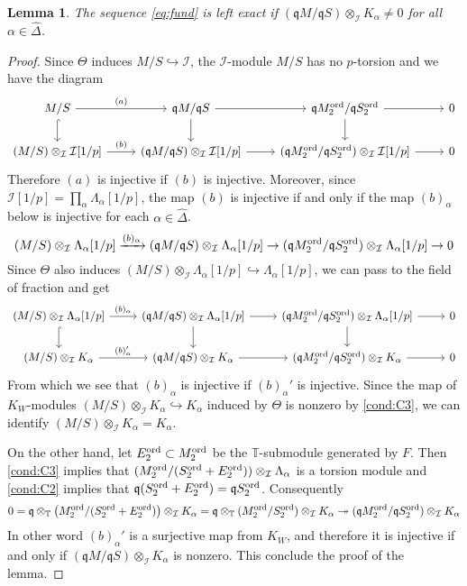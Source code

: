 \documentclass[leqno]{amsart}
\newtheorem{lem}[thm]{Lemma}
\theoremstyle{definition}
\theoremstyle{remark}
\newcommand{\fq}{\mathfrak{q}}
\newcommand{\TT}{\mathbb{T}} %
\newcommand{\I}{\mathcal{I}} %
\newcommand{\ord}{\textnormal{ord}} %
\begin{document}
\begin{lem}\label{lem:inj_crit}
The sequence \eqref{eq:fund}
is left exact if 
$(\fq M/\fq S)\otimes_{\I}K_\alpha\neq 0$
for all $\alpha\in\hat{\Delta}$.
\end{lem}
\begin{proof}
Since $\Theta$ induces $M/S\hookrightarrow\I$,
the $\I$-module $M/S$ has no $p$-torsion and we have the diagram
\[
\begin{tikzcd}
M/S
\arrow[r,"(a)"]\arrow[d,hookrightarrow] &
\fq M/\fq S
\arrow[r]\arrow[d] &
\fq M_2^{\ord}/\fq S_2^{\ord}
\arrow[r]\arrow[d] & 0\\
(M/S)\otimes_{\I}\I[1/p]
\arrow[r,"(b)"] &
(\fq M/\fq S)\otimes_{\I}\I[1/p]
\arrow[r] &
(\fq M_2^{\ord}/\fq S_2^{\ord})\otimes_{\I}\I[1/p]
\arrow[r] & 0
\end{tikzcd}
\]
Therefore $(a)$ is injective if
$(b)$ is injective.
Moreover, since $\I[1/p]=\prod_\alpha \Lambda_\alpha[1/p]$,
the map $(b)$ is injective if and only if the map $(b)_\alpha$ below
is injective for each $\alpha\in\hat{\Delta}$.
\[
(M/S)\otimes_{\I}\Lambda_\alpha[1/p]
\xrightarrow{(b)_\alpha}
(\fq M/\fq S)\otimes_{\I}\Lambda_\alpha[1/p] \to
(\fq M_2^{\ord}/\fq S_2^{\ord})\otimes_{\I}\Lambda_\alpha[1/p]\to 0
\]
Since $\Theta$ also induces
$(M/S)\otimes_{\I}\Lambda_\alpha[1/p]
\hookrightarrow\Lambda_\alpha[1/p]$,
we can pass to the field of fraction and get
\[
\begin{tikzcd}
(M/S)\otimes_{\I}\Lambda_\alpha[1/p]
\arrow[r,"(b)_\alpha"]\arrow[d,hookrightarrow] &
(\fq M/\fq S)\otimes_{\I}\Lambda_\alpha[1/p]
\arrow[r]\arrow[d] &
(\fq M_2^{\ord}/\fq S_2^{\ord})\otimes_{\I}\Lambda_\alpha[1/p]
\arrow[r]\arrow[d] & 0\\
(M/S)\otimes_{\I}K_\alpha
\arrow[r,"(b)_\alpha'"] &
(\fq M/\fq S)\otimes_{\I}K_\alpha
\arrow[r] &
(\fq M_2^{\ord}/\fq S_2^{\ord})\otimes_{\I}K_\alpha
\arrow[r] & 0
\end{tikzcd}
\]
From which we see that $(b)_\alpha$ 
is injective if $(b)_\alpha'$ is injective.
Since the map of $K_W$-modules
$(M/S)\otimes_{\I}K_\alpha\hookrightarrow K_\alpha$
induced by $\Theta$ is nonzero by \ref{cond:C3},
we can identify
$(M/S)\otimes_{\I}K_\alpha=K_\alpha$.

On the other hand,
let $E_2^{\ord}\subset M_2^{\ord}$
be the $\TT$-submodule generated by $F$.
Then \ref{cond:C3} implies that
$(M_2^{\ord}/(S_2^{\ord}+E_2^{\ord}))\otimes_{\I}\Lambda_\alpha$
is a torsion module and \ref{cond:C2} implies that
$\fq(S_2^{\ord}+E_2^{\ord})=\fq S_2^{\ord}$.
Consequently
\[
    0=\fq\otimes_{\TT}\left(M_2^{\ord}/(S_2^{\ord}+E_2^{\ord})\right)
    \otimes_{\I}K_\alpha
    =\fq\otimes_{\TT}(M_2^{\ord}/S_2^{\ord})
    \otimes_{\I}K_\alpha
    \twoheadrightarrow
    (\fq M_2^{\ord}/\fq S_2^{\ord})\otimes_{\I}K_\alpha
\]
In other word $(b)_\alpha'$ is a surjective map from $K_W$,
and therefore it is injective if and only if
$(\fq M/\fq S)\otimes_{\I}K_\alpha$ is nonzero.
This conclude the proof of the lemma.
\end{proof}
\end{document}
